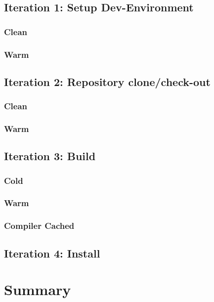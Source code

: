 \subsection{Iteration 1: Setup Dev-Environment}
\subsubsection{Clean}
\subsubsection{Warm}
\subsection{Iteration 2: Repository clone/check-out}
\subsubsection{Clean}
\subsubsection{Warm}
\subsection{Iteration 3: Build}
\subsubsection{Cold}
\subsubsection{Warm}
\subsubsection{Compiler Cached}
\subsection{Iteration 4: Install}


\section{Summary}